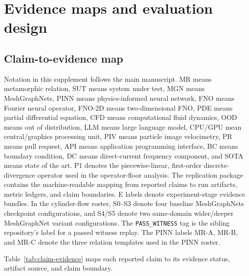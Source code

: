 
\renewcommand{\thetable}{A\arabic{table}}
\setcounter{table}{0}
\section{Evidence maps and evaluation design}
\label{app:evidence-design}

\subsection{Claim-to-evidence map}
\label{app:claim-evidence}

Notation in this supplement follows the main manuscript. MR means metamorphic
relation, SUT means system under test, MGN means MeshGraphNets, PINN means
physics-informed neural network, FNO means Fourier neural operator, FNO-2D
means two-dimensional FNO, PDE means partial differential equation, CFD means
computational fluid dynamics, OOD means out of distribution, LLM means large
language model, CPU/GPU mean central/graphics processing unit, PIV means
particle image velocimetry, PR means pull request, API means application
programming interface, BC means boundary condition, DC means direct-current
frequency component, and SOTA means state of the art. P1 denotes the
piecewise-linear, first-order discrete-divergence operator used in the
operator-floor analysis.
The replication package contains the machine-readable mapping from reported
claims to run artifacts, metric ledgers, and claim boundaries. E labels denote
experiment-stage evidence bundles. In the cylinder-flow roster, S0--S3 denote
four baseline MeshGraphNets checkpoint configurations, and S4/S5 denote two
same-domain wider/deeper MeshGraphNet variant configurations. The
\texttt{PASS\_WITNESS} tag is the sibling repository's label for a passed
witness replay. The PINN labels MR-A, MR-B, and MR-C denote the three relation
templates used in the PINN roster.

Table~\ref{tab:claim-evidence} maps each reported claim to its evidence
status, artifact source, and claim boundary.


